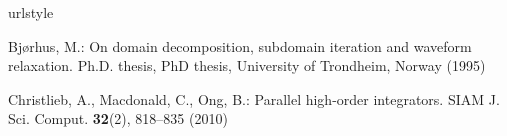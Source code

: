 \documentclass{svmult-ddm}
\begin{document}

\begin{thebibliography}{10}
\providecommand{\url}[1]{{#1}}
\providecommand{\urlprefix}{URL }
\expandafter\ifx\csname urlstyle\endcsname\relax
  \providecommand{\doi}[1]{DOI~\discretionary{}{}{}#1}\else
  \providecommand{\doi}{DOI~\discretionary{}{}{}\begingroup
  \urlstyle{rm}\Url}\fi


Bj{\o}rhus, M.: On domain decomposition, subdomain iteration and waveform
  relaxation.
\newblock Ph.D. thesis, PhD thesis, University of Trondheim, Norway (1995)

Christlieb, A., Macdonald, C., Ong, B.: Parallel high-order integrators.
\newblock SIAM J. Sci. Comput. \textbf{32}(2), 818--835 (2010)





\end{thebibliography}
\end{document}
